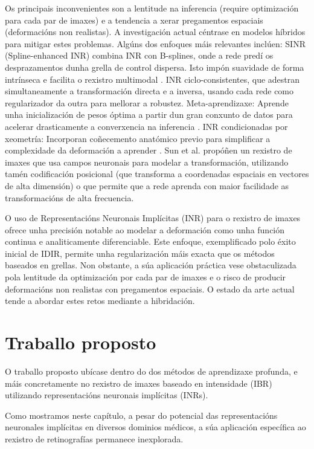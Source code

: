 Os principais inconvenientes son a lentitude na inferencia (require optimización para cada par de imaxes) e a tendencia a xerar pregamentos espaciais (deformacións non realistas). A investigación actual céntrase en modelos híbridos para mitigar estes problemas.
Algúns dos enfoques máis relevantes inclúen:
SINR (Spline-enhanced INR) combina INR con B-splines, onde a rede predí os desprazamentos dunha grella de control dispersa. Isto impón suavidade de forma intrínseca e facilita o rexistro multimodal \cite{SINR}.   
INR ciclo-consistentes, que adestran simultaneamente a transformación directa e a inversa, usando cada rede como regularizador da outra para mellorar a robustez.  
Meta-aprendizaxe: Aprende unha inicialización de pesos óptima a partir dun gran conxunto de datos para acelerar drasticamente a converxencia na inferencia \cite{learnedinit}.  
INR condicionadas por xeometría: Incorporan coñecemento anatómico previo para simplificar a complexidade da deformación a aprender \cite{harten2023deformable}.  
Sun et al. \cite{sun2024medicalimageregistrationneural} propóñen un rexistro de imaxes que usa campos neuronais para modelar a transformación, utilizando tamén codificación posicional (que transforma a coordenadas espaciais en vectores de alta dimensión) o que permite que a rede aprenda con maior facilidade as transformacións de alta frecuencia.

O uso de Representacións Neuronais Implícitas (INR) para o rexistro de imaxes ofrece unha precisión notable ao modelar a deformación como unha función continua e analiticamente diferenciable. Este enfoque, exemplificado polo éxito inicial de IDIR, permite unha regularización máis exacta que os métodos baseados en grellas. Non obstante, a súa aplicación práctica vese obstaculizada pola lentitude da optimización por cada par de imaxes e o risco de producir deformacións non realistas con pregamentos espaciais. O estado da arte actual tende a abordar estes retos mediante a hibridación.

\section{Traballo proposto}
\label{sec:Traballo proposto}

O traballo proposto ubícase dentro do dos métodos de aprendizaxe profunda, e máis concretamente no rexistro de imaxes baseado en intensidade (IBR) utilizando representacións neuronais implícitas (INRs).

Como mostramos neste capítulo, a pesar do potencial das representacións neuronales implícitas en diversos dominios médicos, a súa aplicación específica ao rexistro de retinografías permanece inexplorada.

